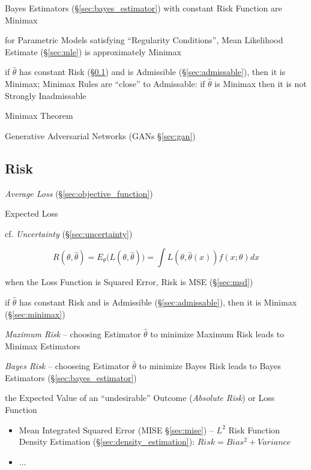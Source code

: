 Bayes Estimators (\S\ref{sec:bayes_estimator}) with constant Risk Function are
Minimax

for Parametric Models satisfying ``Regularity Conditions'', Mean Likelihood
Estimate (\S\ref{sec:mle}) is approximately Minimax

if $\hat{\theta}$ has constant Risk (\S\ref{sec:risk}) and is Admissible
(\S\ref{sec:admissable}), then it is Minimax;
Minimax Rules are ``close'' to Admissable: if $\hat{\theta}$ is Minimax then it
is not Strongly Inadmissable

Minimax Theorem

\fist Generative Adversarial Networks (GANs \S\ref{sec:gan})



\subsection{Risk}\label{sec:risk}

\emph{Average Loss} (\S\ref{sec:objective_function})

Expected Loss

cf. \emph{Uncertainty} (\S\ref{sec:uncertainty})

\[
  R(\theta,\hat{\theta}) = E_\theta\Big(L(\theta,\hat{\theta})\Big) =
    \int L(\theta,\hat{\theta}(x))f(x;\theta) dx
\]

when the Loss Function is Squared Error, Risk is MSE (\S\ref{sec:msd})

if $\hat{\theta}$ has constant Risk and is Admissible (\S\ref{sec:admissable}),
then it is Minimax (\S\ref{sec:minimax})

\emph{Maximum Risk} -- choosing Estimator $\hat{\theta}$ to minimize Maximum
Risk leads to Minimax Estimators

\emph{Bayes Risk} -- chooseing Estimator $\hat{\theta}$ to minimize Bayes Risk
leads to Bayes Estimators (\S\ref{sec:bayes_estimator})

the Expected Value of an ``undesirable'' Outcome (\emph{Absolute Risk}) or Loss
Function

\begin{itemize}
  \item Mean Integrated Squared Error (MISE \S\ref{sec:mise}) -- $L^2$ Risk
    Function \fist Density Estimation (\S\ref{sec:density_estimation}):
    $Risk = Bias^2 + Variance$
  \item ...
\end{itemize}



